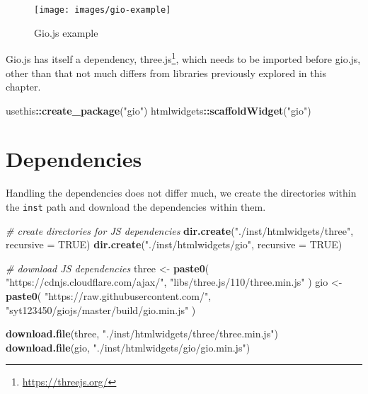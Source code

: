 \documentclass[10pt,]{krantz}
\makeatletter
\newenvironment{Shaded}{\begin{snugshade}}{\end{snugshade}}
\newcommand{\CommentTok}[1]{\textcolor[rgb]{0.37,0.37,0.37}{\textit{#1}}}
\newcommand{\DataTypeTok}[1]{\textcolor[rgb]{0.27,0.27,0.27}{#1}}
\newcommand{\KeywordTok}[1]{\textcolor[rgb]{0.27,0.27,0.27}{\textbf{#1}}}
\newcommand{\NormalTok}[1]{#1}
\newcommand{\OperatorTok}[1]{\textcolor[rgb]{0.43,0.43,0.43}{\textbf{#1}}}
\newcommand{\OtherTok}[1]{\textcolor[rgb]{0.37,0.37,0.37}{#1}}
\newcommand{\StringTok}[1]{\textcolor[rgb]{0.5,0.5,0.5}{#1}}
\renewcommand{\href}[2]{#2\footnote{\url{#1}}}
\newenvironment{kframe}{%
\medskip{}
\setlength{\fboxsep}{.8em}
 \def\at@end@of@kframe{}%
 \ifinner\ifhmode%
  \def\at@end@of@kframe{\end{minipage}}%
  \begin{minipage}{\columnwidth}%
 \fi\fi%
 \def\FrameCommand##1{\hskip\@totalleftmargin \hskip-\fboxsep
 \colorbox{shadecolor}{##1}\hskip-\fboxsep
     \hskip-\linewidth \hskip-\@totalleftmargin \hskip\columnwidth}%
 \MakeFramed {\advance\hsize-\width
   \@totalleftmargin\z@ \linewidth\hsize
   \@setminipage}}%
 {\par\unskip\endMakeFramed%
 \at@end@of@kframe}
\renewenvironment{Shaded}{\begin{kframe}}{\end{kframe}}
\makeatother
\begin{document}
\begin{figure}[H]

{\centering \texttt{[image: images/gio-example]} 

}

\caption{Gio.js example}\label{fig:gio-example}
\end{figure}

Gio.js has itself a dependency, \href{https://threejs.org/}{three.js}, which needs to be imported before gio.js, other than that not much differs from libraries previously explored in this chapter.

\begin{Shaded}
\begin{Highlighting}[]
\NormalTok{usethis}\OperatorTok{::}\KeywordTok{create_package}\NormalTok{(}\StringTok{"gio"}\NormalTok{)}
\NormalTok{htmlwidgets}\OperatorTok{::}\KeywordTok{scaffoldWidget}\NormalTok{(}\StringTok{"gio"}\NormalTok{)}
\end{Highlighting}
\end{Shaded}

\hypertarget{widgets-full-deps}{%
\section{Dependencies}\label{widgets-full-deps}}

Handling the dependencies does not differ much, we create the directories within the \texttt{inst} path and download the dependencies within them.

\begin{Shaded}
\begin{Highlighting}[]
\CommentTok{# create directories for JS dependencies}
\KeywordTok{dir.create}\NormalTok{(}\StringTok{"./inst/htmlwidgets/three"}\NormalTok{, }\DataTypeTok{recursive =} \OtherTok{TRUE}\NormalTok{)}
\KeywordTok{dir.create}\NormalTok{(}\StringTok{"./inst/htmlwidgets/gio"}\NormalTok{, }\DataTypeTok{recursive =} \OtherTok{TRUE}\NormalTok{)}

\CommentTok{# download JS dependencies}
\NormalTok{three <-}\StringTok{ }\KeywordTok{paste0}\NormalTok{(}
  \StringTok{"https://cdnjs.cloudflare.com/ajax/"}\NormalTok{,}
  \StringTok{"libs/three.js/110/three.min.js"}
\NormalTok{)}
\NormalTok{gio <-}\StringTok{ }\KeywordTok{paste0}\NormalTok{(}
  \StringTok{"https://raw.githubusercontent.com/"}\NormalTok{,}
  \StringTok{"syt123450/giojs/master/build/gio.min.js"}
\NormalTok{)}

\KeywordTok{download.file}\NormalTok{(three, }\StringTok{"./inst/htmlwidgets/three/three.min.js"}\NormalTok{)}
\KeywordTok{download.file}\NormalTok{(gio, }\StringTok{"./inst/htmlwidgets/gio/gio.min.js"}\NormalTok{)}
\end{Highlighting}
\end{Shaded}
\end{document}
